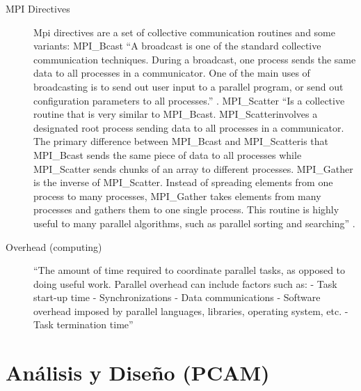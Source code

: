 \documentclass[fleqn,10pt]{SelfArx} %
\begin{document}
\begin{description}
	\item[MPI Directives]
	Mpi directives are a set of collective communication routines and some variants:
	MPI\_Bcast
	“A broadcast is one of the standard collective communication techniques. During a broadcast, one process sends the same data to all processes in a communicator. One of the main uses of broadcasting is to send out user input to a parallel program, or send out configuration parameters to all processes.” \cite{mpi_bcast}.
	MPI\_Scatter 
	“Is a collective routine that is very similar to MPI\_Bcast. MPI\_Scatterinvolves a designated root process sending data to all processes in a communicator. The primary difference between MPI\_Bcast and MPI\_Scatteris that MPI\_Bcast sends the same piece of data to all processes while MPI\_Scatter sends chunks of an array to different processes.
	MPI\_Gather is the inverse of MPI\_Scatter. Instead of spreading elements from one process to many processes, MPI\_Gather takes elements from many processes and gathers them to one single process. This routine is highly useful to many parallel algorithms, such as parallel sorting and searching” \cite{mpi_directives}.
	
	\item[Overhead (computing)] “The amount of time required to coordinate parallel tasks, as opposed to doing useful work. Parallel overhead can include factors such as:
	- Task start-up time
	- Synchronizations
	- Data communications
	- Software overhead imposed by parallel languages, libraries, operating system, etc.
	- Task termination time”  \cite{parallel_comp_lawrence_nat_lab}
	
	
\end{description}




\section{Análisis y Diseño (PCAM)}
\end{document}
